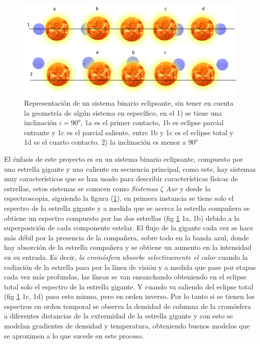 \documentclass[12pt,oneside,openany,letter]{book}
\begin{document}
\begin{figure}[h]
    \centering
    \includegraphics[width=1\linewidth]{Images/representacion_eclipse.png}
    \caption{Representación de un sistema binario eclipsante, sin tener en cuenta la geometría de algún sistema en específico, en el 1) se tiene una inclinación $i = 90^{o}$, 1a es el primer contacto, 1b es eclipse parcial entrante y 1c es el parcial saliente, entre 1b y 1c es el eclipse total y 1d es el cuarto contacto. 2) la inclinación es menor a $90^{o}$ }
    \label{representacion_eclipse}
\end{figure}

\noindent El énfasis de este proyecto es en un sistema binario eclipsante, compuesto por una estrella gigante y una caliente en secuencia principal, como este, hay sistemas muy característicos que se han usado para describir características físicas de estrellas, estos sistemas se conocen como \textit{Sistemas $\zeta$ Aur} \citep{ake2015giants} y desde la espectroscopia, siguiendo la figura (\ref{representacion_eclipse}), en primera instancia se tiene solo el espectro de la estrella gigante y a medida que se acerca la estrella compañera se obtiene un espectro compuesto por las dos estrellas (fig \ref{representacion_eclipse} 1a, 1b) debido a la superposición de cada componente estelar. El flujo de la gigante cada vez se hace más débil por la presencia de la compañera, sobre todo en la banda azul, donde hay absorción de la estrella compañera y se obtiene un aumento en la intensidad en su entrada. Es decir, \textit{la cromósfera absorbe selectivamente el calor} cuando la radiación de la estrella pasa por la línea de visión y a medida que pase por etapas cada vez más profundas, las líneas se van ensanchando obteniendo en el eclipse total solo el espectro de la estrella gigante. Y cuando va saliendo del eclipse total (fig \ref{representacion_eclipse} 1c, 1d) pasa esto mismo, pero en orden inverso. Por lo tanto si se tienen los espectros en orden temporal se observa la densidad de columna de la cromósfera a diferentes distancias de la extremidad de la estrella gigante y con esto se modelan gradientes de densidad y temperatura, obteniendo buenos modelos que se aproximen a lo que sucede en este proceso.
\end{document}
